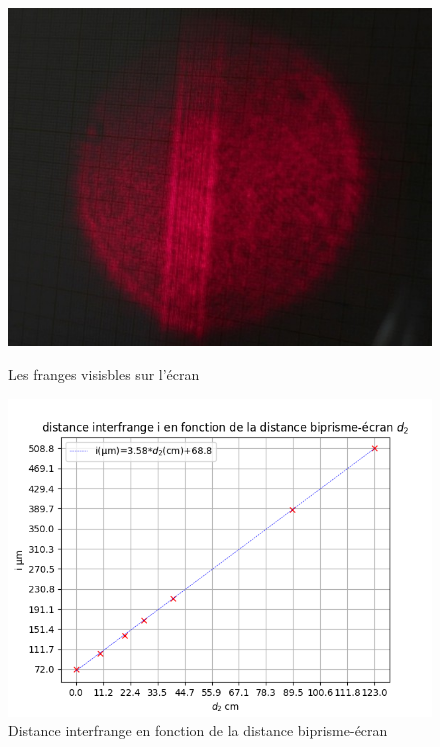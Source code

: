 \documentclass[11pt, a4paper]{article}
\begin{document}
\begin{figure}[htbp]
    \centering
    \begin{minipage}[t]{0.48\textwidth}
        \centering
        \includegraphics[width=\textwidth]{images/photo}
        \caption{Les franges visisbles sur l'écran}
        \label{photo}
    \end{minipage}
    \hfill
    \begin{minipage}[t]{0.48\textwidth}
        \centering
        \includegraphics[width=\textwidth]{images/2.1}
        \caption{Distance interfrange en fonction de la distance biprisme-écran}
        \label{courbe1}
    \end{minipage}
\end{figure}
\end{document}
